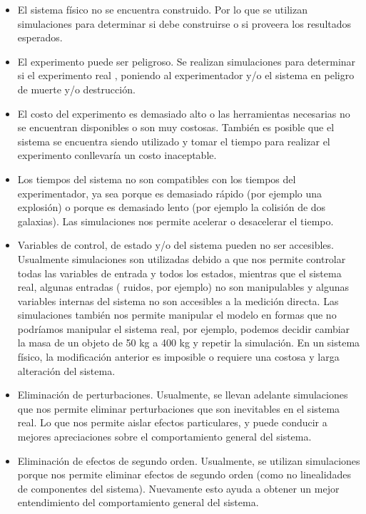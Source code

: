 \begin{itemize}
	\item 
    El sistema físico no se encuentra construido. Por lo que se utilizan simulaciones para determinar si debe construirse o si proveera los resultados esperados.
	
	\item El experimento puede ser peligroso. Se realizan simulaciones para determinar si el experimento real , poniendo al experimentador y/o el sistema en peligro de muerte y/o destrucción.

	\item El costo del experimento es demasiado alto o las herramientas necesarias no se encuentran disponibles o son muy costosas.
 También es posible que el sistema se encuentra siendo utilizado y tomar el tiempo para realizar el experimento conllevaría un costo inaceptable.

	\item Los tiempos del sistema no son compatibles con los tiempos del experimentador, ya sea porque es demasiado rápido (por ejemplo una explosión) o porque es demasiado lento (por ejemplo la colisión de dos galaxias). Las simulaciones nos permite acelerar o desacelerar el tiempo.

	\item Variables de control, de estado y/o del sistema pueden no ser accesibles. Usualmente simulaciones son utilizadas debido a que nos permite controlar todas las variables de entrada y todos los estados, mientras que el sistema real, algunas entradas ( ruidos, por ejemplo) no son manipulables y algunas variables internas del sistema no son accesibles a la medición directa. Las simulaciones también nos permite manipular el modelo en formas que no podríamos manipular el sistema real, por ejemplo, podemos decidir cambiar la masa de un objeto de 50 kg a 400 kg y repetir la simulación. En un sistema físico, la modificación anterior es imposible o requiere una costosa y larga alteración del sistema.

	\item Eliminación de perturbaciones. Usualmente, se llevan adelante simulaciones que nos permite eliminar perturbaciones que son inevitables en el sistema real. Lo que nos permite aislar efectos particulares, y puede conducir a mejores apreciaciones sobre el comportamiento general del sistema.

	\item Eliminación de efectos de segundo orden. Usualmente, se utilizan simulaciones porque nos permite eliminar efectos de segundo orden (como no linealidades de componentes del sistema). Nuevamente esto ayuda a obtener un mejor entendimiento del comportamiento general del sistema.
\end{itemize}

